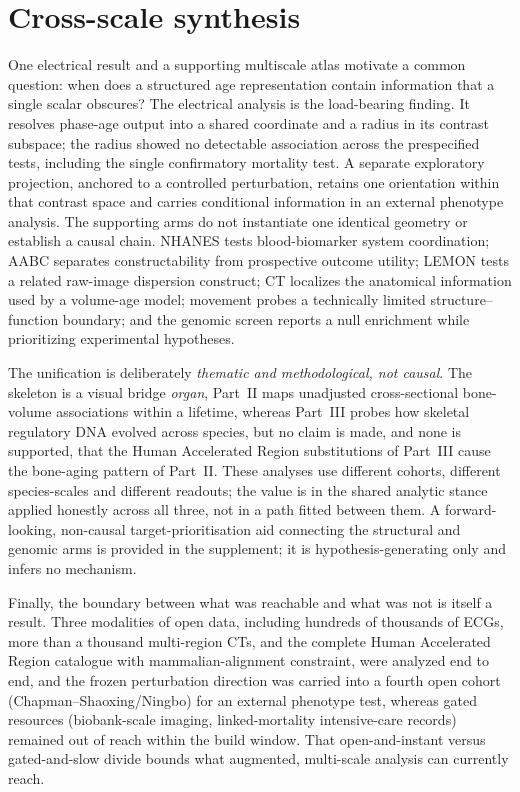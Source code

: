 \documentclass[11pt]{article}
\begin{document}
\bigskip
\section{Cross-scale synthesis}
\label{sec:synthesis}

One electrical result and a supporting multiscale atlas motivate a common
question: when does a structured age representation contain information that a
single scalar obscures? The electrical analysis is the load-bearing finding.
It resolves phase-age output into a shared coordinate and a radius in its
contrast subspace; the radius showed no detectable association across the
prespecified tests, including the single confirmatory mortality test. A
separate exploratory projection, anchored to a controlled perturbation, retains
one orientation within that contrast space and carries conditional information
in an external phenotype analysis. The supporting arms do not instantiate one
identical geometry or establish a causal chain. NHANES tests blood-biomarker
system coordination; AABC separates constructability from prospective outcome
utility; LEMON tests a related raw-image dispersion construct; CT localizes the
anatomical information used by a volume-age model; movement probes a technically
limited structure--function boundary; and the genomic screen reports a null
enrichment while prioritizing experimental hypotheses.

The unification is deliberately \emph{thematic and methodological, not causal}. The skeleton is a
visual bridge \emph{organ}, Part~II maps unadjusted cross-sectional bone-volume
associations within a lifetime, whereas Part~III probes how
skeletal regulatory DNA evolved across species, but no claim is made, and none is supported, that
the Human Accelerated Region substitutions of Part~III cause the bone-aging pattern of Part~II.
These analyses use different cohorts, different species-scales and different readouts; the value is
in the shared analytic stance applied honestly across all three, not in a path fitted between them.
A forward-looking, non-causal target-prioritisation aid connecting the structural and genomic arms
is provided in the supplement; it is hypothesis-generating only and infers no mechanism.

Finally, the boundary between what was reachable and what was not is itself a result. Three
modalities of open data, including hundreds of thousands of ECGs, more than a thousand multi-region CTs, and
the complete Human Accelerated Region catalogue with mammalian-alignment constraint, were analyzed
end to end, and the frozen perturbation direction was carried into a fourth open cohort
(Chapman--Shaoxing/Ningbo) for an external phenotype test, whereas gated resources
(biobank-scale imaging, linked-mortality intensive-care records) remained out of reach within the
build window. That open-and-instant versus gated-and-slow divide bounds what augmented,
multi-scale analysis can currently reach.
\end{document}
